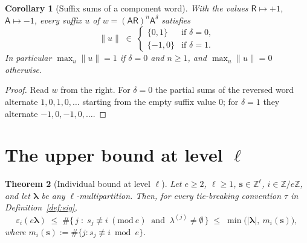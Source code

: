 \documentclass[11pt]{article}
\newtheorem{theorem}{Theorem}
\newtheorem{corollary}[theorem]{Corollary}
\theoremstyle{definition}
\newcommand{\ZZ}{\mathbb{Z}}
\newcommand{\eps}{\varepsilon}
\newcommand{\Aa}{{\mathsf A}}
\newcommand{\Rr}{{\mathsf R}}
\newcommand{\bs}{\mathbf{s}}
\newcommand{\blam}{\boldsymbol{\lambda}}
\begin{document}
\begin{corollary}[Suffix sums of a component word]\label{cor:suffix}
With the values $\Rr \mapsto +1$, $\Aa \mapsto -1$, every suffix $u$ of
$w = (\Aa\Rr)^n\Aa^{\delta}$ satisfies
\[
  \|u\| \;\in\; \begin{cases}\{0,1\} & \text{if } \delta = 0,\\
                              \{-1,0\} & \text{if } \delta = 1.\end{cases}
\]
In particular $\max_u \|u\| = 1$ if $\delta = 0$ and $n \ge 1$, and
$\max_u \|u\| = 0$ otherwise.
\end{corollary}

\begin{proof}
Read $w$ from the right. For $\delta = 0$ the partial sums of the reversed
word alternate $1, 0, 1, 0, \dots$ starting from the empty suffix value
$0$; for $\delta = 1$ they alternate $-1, 0, -1, 0, \dots$.
\end{proof}

\section{The upper bound at level $\ell$}\label{sec:bound}

\begin{theorem}[Individual bound at level $\ell$]\label{thm:main}
Let $e \ge 2$, $\ell \ge 1$, $\bs \in \ZZ^\ell$, $i \in \ZZ/e\ZZ$, and let
$\blam$ be any $\ell$-multipartition. Then, for \emph{every} tie-breaking
convention $\tau$ in Definition~\ref{def:sig},
\[
  \eps_i(e\blam) \;\le\;
  \#\bigl\{\, j \;:\; s_j \not\equiv i \ (\mathrm{mod}\ e)
    \ \text{ and } \ \lambda^{(j)} \ne \emptyset \,\bigr\}
  \;\le\; \min\bigl( |\blam|,\ m_i(\bs) \bigr),
\]
where $m_i(\bs) := \#\{ j : s_j \not\equiv i \bmod e\}$.
\end{theorem}
\end{document}
